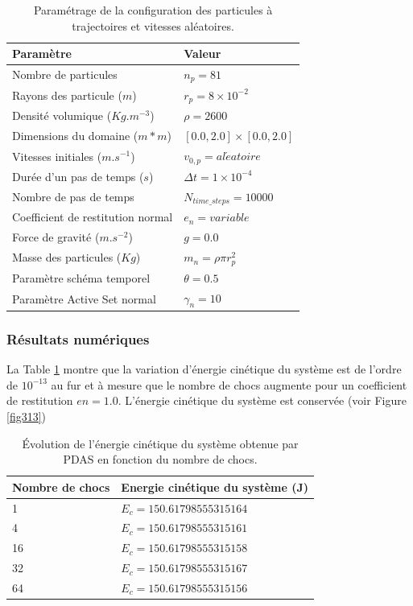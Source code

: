 \begin{center}
\begin{table}[!h]
\begin{tabular}{ |p{5.75cm}|p{6.8cm}| }
 \hline \rowcolor{lightgray}

 Paramètre& Valeur\\
 \hline
 Nombre de particules & $n_p = 81$\\
 Rayons des particule ($m$) & $r_p = 8\times10^{-2}$\\
 Densité volumique ($Kg.m^{-3}$)& $\rho = 2600$\\
 Dimensions du domaine ($m*m$) & $[0.0,2.0] \times [0.0,2.0]$\\
 Vitesses initiales  ($m.s^{-1}$)  &$v_{0,p} = al\acute{e}atoire$\\
 Durée d'un pas de temps ($s$)&   $\Delta t = 1\times10^{-4}$\\
 Nombre de pas de temps& $N_{time\_steps} = 10000$\\
 Coefficient de restitution normal& $e_n = variable$\\
 Force de gravité ($m.s^{-2}$)& $g = 0.0$\\
 Masse des particules ($Kg$)  &$m_n = \rho  \pi r_p^{2}$\\
 Paramètre schéma temporel & $\theta = 0.5$\\
 Paramètre Active Set normal &$\gamma_n = 10$\\
 \hline
\end{tabular}
\caption{Paramétrage  de la configuration des particules à trajectoires et vitesses aléatoires.}
\end{table}
\end{center}
\vspace{-1.0cm}
\subsubsection{Résultats numériques}

La Table \ref{ec_81part} montre que la variation d'énergie cinétique du système est de l'ordre de $10^{-13}$ au fur et à mesure que le nombre de chocs augmente pour un coefficient de restitution $en = 1.0$. L'énergie cinétique du système est conservée (voir Figure \ref{fig313})

\begin{center}
\begin{table}[!h]
\begin{tabular}{ |p{5.75cm}|p{6.8cm}| }
 \hline \rowcolor{lightgray}

 Nombre de chocs& Energie cinétique du système (J)\\
 \hline
 1 & $E_c = 150.61798555315164$\\
 4 & $E_c = 150.61798555315161$\\
 16 & $E_c = 150.61798555315158$\\
 32 & $E_c = 150.61798555315167$\\
 64 & $E_c = 150.61798555315156$\\
 \hline
\end{tabular}
\caption{Évolution de l'énergie cinétique du système obtenue par PDAS en fonction du nombre de chocs.}\label{ec_81part}
\end{table}
\end{center}

